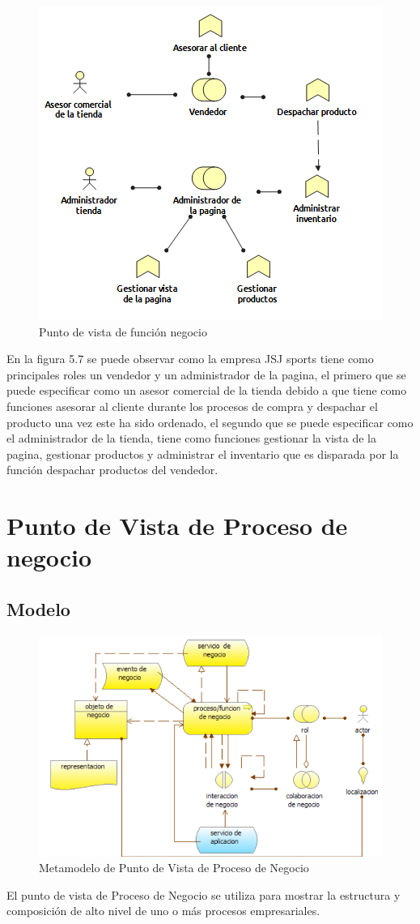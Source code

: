\begin{figure}[th!]
	\centering
	\includegraphics[width=0.6\linewidth]{arquitectura/imagenes/vistaNegocio}
	\caption{Punto de vista de función negocio}
	\label{fig:Punto de vista de funcion de negocio}
\end{figure}

En la figura 5.7 se puede observar como la empresa JSJ sports tiene como principales roles un vendedor y un administrador de la pagina, el primero que se puede especificar como un asesor comercial de la tienda debido a que tiene como funciones asesorar al cliente durante los procesos de compra y despachar el producto una vez este ha sido ordenado, el segundo que se puede especificar como el administrador de la tienda, tiene como funciones gestionar la vista de la pagina, gestionar productos y administrar el inventario que es disparada por la función despachar productos del vendedor. 



\newpage

\section{Punto de Vista de Proceso de negocio}

\subsection{Modelo}
\begin{figure}[th!]
	\centering
	\includegraphics[width=0.6\linewidth]{arquitectura/imagenes/modeloProcesoNegocio}
	\caption{Metamodelo de Punto de Vista de Proceso de Negocio \cite{pun4}}
	\label{fig:metamodelo de punto de vista de proceso de negocio}
\end{figure} 
El punto de vista de Proceso de Negocio se utiliza para mostrar la estructura y composición de alto nivel de uno o más procesos empresariales. 
\newpage

